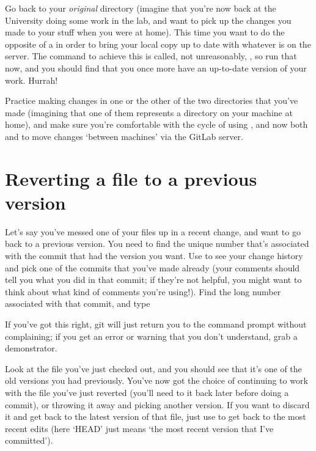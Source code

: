 Go back to your \emph{original}  directory (imagine that you're now back at the University doing some work in the lab, and want to pick up the changes you made to your stuff when you were at home). This time you want to do the opposite of a  in order to bring your local copy up to date with whatever is on the server. The command to achieve this is called, not unreasonably, , so run that now, and you should find that you once more have an up-to-date version of your work. Hurrah!

Practice making changes in one or the other of the two  directories that you've made (imagining that one of them represents a directory on your machine at home), and make sure you're comfortable with the cycle of using ,  and now both  and  to move changes `between machines' via the GitLab server.

\section{Reverting a file to a previous version}

Let's say you've messed one of your files up in a recent change, and want to go back to a previous version. You need to find the unique number that's associated with the commit that had the version you want. Use  to see your change history and pick one of the commits that you've made already (your comments should tell you what you did in that commit; if they're not helpful, you might want to think about what kind of comments you're using!). Find the long number associated with that commit, and type


If you've got this right, git will just return you to the command prompt without complaining; if you get an error or warning that you don't understand, grab a demonstrator. 

Look at the file you've just checked out, and you should see that it's one of the old versions you had previously. You've now got the choice of continuing to work with the file you've just reverted (you'll need to  it back later before doing a commit), or throwing it away and picking another version. If you want to discard it and get back to the latest version of that file, just use  to get back to the most recent edits (here `HEAD' just means `the most recent version that I've committed').

